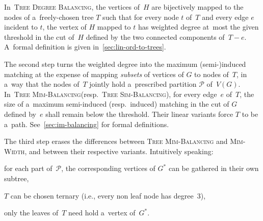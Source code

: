 \documentclass[a4paper,UKenglish,cleveref,hyperref,autoref]{lipics-v2021}
\newcommand{\tdb}{\textsc{Tree Degree Balancing}\xspace}
\newcommand{\tmb}{\textsc{Tree Mim-Balancing}\xspace}
\newcommand{\tsb}{\textsc{Tree Sim-Balancing}\xspace}
\begin{document}
In~\tdb, the vertices of~$H$ are bijectively mapped to the nodes of a~freely-chosen tree $T$ such that for every node $t$ of~$T$ and every edge $e$ incident to $t$, the vertex of $H$ mapped to $t$ has weighted degree at~most the given threshold in the cut of~$H$ defined by the two connected components of~$T-e$. 
A~formal definition is given in~\cref{sec:lin-ord-to-trees}.

The second step turns the weighted degree into the maximum (semi-)induced matching at the expense of mapping \emph{subsets} of vertices of $G$ to nodes of~$T$, in a~way that the nodes of~$T$ jointly hold a~prescribed partition $\mathcal P$ of~$V(G)$.
In~\tmb (resp.~\tsb), for every edge~$e$ of~$T$, the size of a~maximum semi-induced (resp.~induced) matching in the cut of $G$ defined by~$e$ shall remain below the threshold.
Their linear variants force $T$ to be a~path.
See~\cref{sec:im-balancing} for formal definitions.

The third step erases the differences between \tmb and \textsc{Mim-Width}, and between their respective variants.
Intuitively speaking:
\begin{compactitem}
\item for each part of~$\mathcal P$, the corresponding vertices of $G^*$ can be gathered in their own subtree,
\item $T$ can be chosen ternary (i.e., every non leaf node has degree~3),
\item only the leaves of~$T$ need hold a~vertex of~$G^*$.
\end{compactitem}
\end{document}
